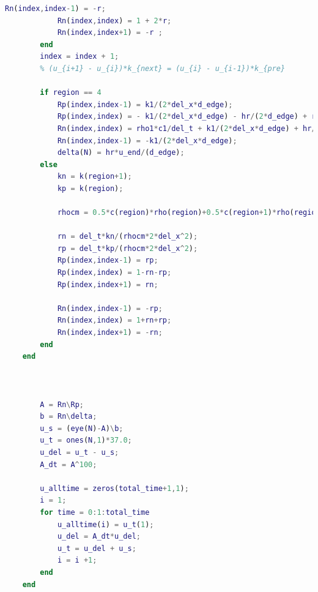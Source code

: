 \documentclass{cumcmthesis}
\begin{document}
\begin{appendices}
\begin{lstlisting}[language=matlab]
            Rn(index,index-1) = -r;
            Rn(index,index) = 1 + 2*r;
            Rn(index,index+1) = -r ;
        end
        index = index + 1;
        % (u_{i+1} - u_{i})*k_{next} = (u_{i} - u_{i-1})*k_{pre}
        
        if region == 4
            Rp(index,index-1) = k1/(2*del_x*d_edge);
            Rp(index,index) = - k1/(2*del_x*d_edge) - hr/(2*d_edge) + rho1*c1/del_t;
            Rn(index,index) = rho1*c1/del_t + k1/(2*del_x*d_edge) + hr/(2*d_edge);
            Rn(index,index-1) = -k1/(2*del_x*d_edge);
            delta(N) = hr*u_end/(d_edge);
        else
            kn = k(region+1);
            kp = k(region);
    
            rhocm = 0.5*c(region)*rho(region)+0.5*c(region+1)*rho(region+1);
            
            rn = del_t*kn/(rhocm*2*del_x^2);
            rp = del_t*kp/(rhocm*2*del_x^2);
            Rp(index,index-1) = rp;   
            Rp(index,index) = 1-rn-rp;
            Rp(index,index+1) = rn;
    
            Rn(index,index-1) = -rp;
            Rn(index,index) = 1+rn+rp;
            Rn(index,index+1) = -rn;
        end
    end
    
    
    
        A = Rn\Rp;
        b = Rn\delta;
        u_s = (eye(N)-A)\b;
        u_t = ones(N,1)*37.0;
        u_del = u_t - u_s;
        A_dt = A^100;
        
        u_alltime = zeros(total_time+1,1);
        i = 1;
        for time = 0:1:total_time
            u_alltime(i) = u_t(1);
            u_del = A_dt*u_del;
            u_t = u_del + u_s;
            i = i +1;
        end
    end
\end{lstlisting}

\end{appendices}
\end{document}
